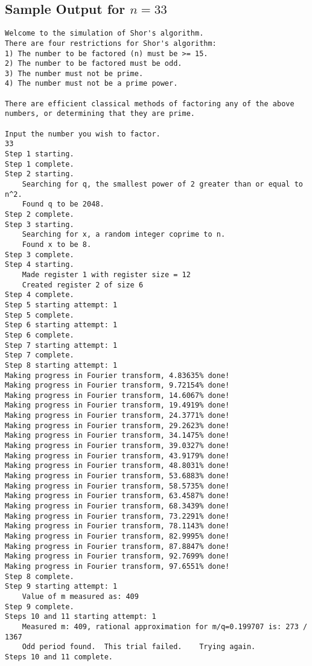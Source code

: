 \documentclass[]{article}
\begin{document}
\subsection{Sample Output for $n = 33$}
\begin{verbatim}
Welcome to the simulation of Shor's algorithm.
There are four restrictions for Shor's algorithm:
1) The number to be factored (n) must be >= 15.
2) The number to be factored must be odd.
3) The number must not be prime.
4) The number must not be a prime power.

There are efficient classical methods of factoring any of the above numbers, or determining that they are prime.

Input the number you wish to factor.
33
Step 1 starting.
Step 1 complete.
Step 2 starting.
	Searching for q, the smallest power of 2 greater than or equal to n^2.
	Found q to be 2048.
Step 2 complete.
Step 3 starting.
	Searching for x, a random integer coprime to n.
	Found x to be 8.
Step 3 complete.
Step 4 starting.
	Made register 1 with register size = 12
	Created register 2 of size 6
Step 4 complete.
Step 5 starting attempt: 1
Step 5 complete.
Step 6 starting attempt: 1
Step 6 complete.
Step 7 starting attempt: 1
Step 7 complete.
Step 8 starting attempt: 1
Making progress in Fourier transform, 4.83635% done!
Making progress in Fourier transform, 9.72154% done!
Making progress in Fourier transform, 14.6067% done!
Making progress in Fourier transform, 19.4919% done!
Making progress in Fourier transform, 24.3771% done!
Making progress in Fourier transform, 29.2623% done!
Making progress in Fourier transform, 34.1475% done!
Making progress in Fourier transform, 39.0327% done!
Making progress in Fourier transform, 43.9179% done!
Making progress in Fourier transform, 48.8031% done!
Making progress in Fourier transform, 53.6883% done!
Making progress in Fourier transform, 58.5735% done!
Making progress in Fourier transform, 63.4587% done!
Making progress in Fourier transform, 68.3439% done!
Making progress in Fourier transform, 73.2291% done!
Making progress in Fourier transform, 78.1143% done!
Making progress in Fourier transform, 82.9995% done!
Making progress in Fourier transform, 87.8847% done!
Making progress in Fourier transform, 92.7699% done!
Making progress in Fourier transform, 97.6551% done!
Step 8 complete.
Step 9 starting attempt: 1
	Value of m measured as: 409
Step 9 complete.
Steps 10 and 11 starting attempt: 1
	Measured m: 409, rational approximation for m/q=0.199707 is: 273 / 1367
	Odd period found.  This trial failed. 	 Trying again.
Steps 10 and 11 complete.

\end{verbatim}
\end{document}
